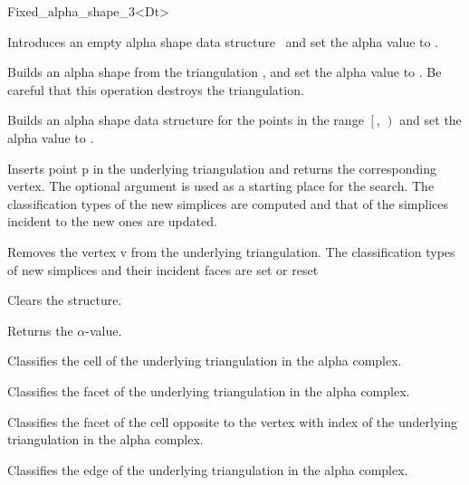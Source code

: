 \begin{ccRefClass} {Fixed_alpha_shape_3<Dt>}
\ccCreation
{}

{Introduces an empty alpha shape data structure
\ccVar\ and set the alpha value to .}

{Builds an alpha shape from the triangulation ,
and set the alpha value to .
Be careful that this operation destroys the triangulation.}

{Builds an alpha shape data structure
for the points in the range
$\left[\right.$, $\left.\right)$ and 
set the alpha value to .
}


\ccModifiers

{
Inserts point p in the underlying triangulation and returns the corresponding vertex.
The optional argument  is used as a starting place for the search.
The classification types of the new simplices are computed and that of the simplices incident 
to the new ones are updated.
}

{
Removes the vertex v from the underlying triangulation.
The classification types of new simplices and their incident faces are set or reset
}

{Clears the structure.}




{Returns the $\alpha$-value.}

{Classifies the cell  of the underlying triangulation in the alpha complex.}

{Classifies the facet  of the underlying triangulation in the alpha complex.}

{Classifies the facet of the cell  opposite to the vertex with index
 of the underlying triangulation in the alpha complex.}

{Classifies the edge  of the underlying triangulation in the alpha complex. }


\end{ccRefClass}
